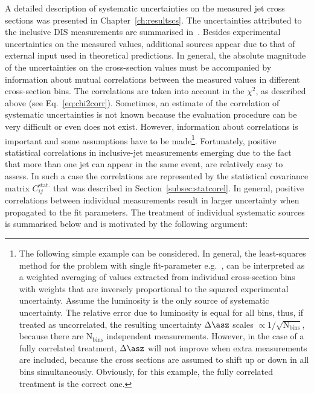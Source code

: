 A detailed description of systematic uncertainties on the measured jet cross sections was presented in Chapter~\ref{ch:resultscs}. The uncertainties attributed to the inclusive DIS measurements are summarised in~\cite{Aaron:2009aa}. Besides experimental uncertainties on the measured values, additional sources appear due to that of external input used in theoretical predictions. In general, the absolute magnitude of the uncertainties on the cross-section values must be accompanied by information about mutual correlations between the measured values in different cross-section bins. The correlations are taken into account in the $\chi^2$, as described above (see Eq.~\ref{eq:chi2corr}). Sometimes, an estimate of the correlation of systematic uncertainties is not known because the evaluation procedure can be very difficult or even does not exist. %
However, information about correlations is important and some assumptions have to be made\footnote{The following simple example can be considered. In general, the least-squares method for the problem with single fit-parameter e.g.~\asz, can be interpreted as a weighted averaging of \asz values extracted from individual cross-section bins with weights that are inversely proportional to the squared experimental uncertainty. Assume the luminosity is the only source of systematic uncertainty. The relative error due to luminosity is equal for all bins, thus, if treated as uncorrelated, the resulting uncertainty $\Delta\asz$ scales $\propto 1/\sqrt{\text{N}_\text{bins}}$, because there are $\text{N}_\text{bins}$ independent \asz measurements. However, in the case of a fully correlated treatment, $\Delta\asz$ will not improve when extra measurements are included, because the cross sections are assumed to shift up or down in all bins simultaneously. Obviously, for this example, the fully correlated treatment is the correct one.}. Fortunately, positive statistical correlations in inclusive-jet measurements emerging due to the fact that more than one jet can appear in the same event, are relatively easy to assess. In such a case the correlations are represented by the statistical covariance matrix $C_{ij}^{\text{stat.}}$ that was described in Section~\ref{subsec:statcorel}. In general, positive correlations between individual measurements result in larger uncertainty when propagated to the fit parameters. The treatment of individual systematic sources is summarised below and is motivated by the following argument: 

